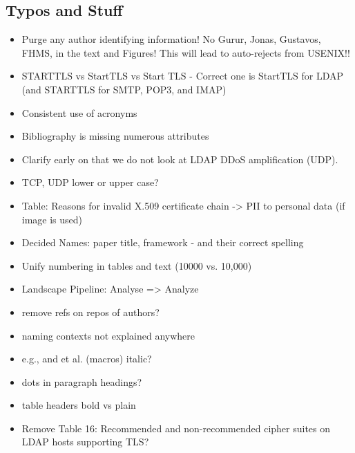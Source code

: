 \subsection*{Typos and Stuff}
\begin{itemize}
    \item {} Purge any author identifying information! No Gurur, Jonas, Gustavos, FHMS, in the text and Figures! This will lead to auto-rejects from USENIX!!
    \item STARTTLS vs StartTLS vs Start TLS - Correct one is StartTLS for LDAP (and STARTTLS for SMTP, POP3, and IMAP)~
    \item Consistent use of acronyms
    \item Bibliography is missing numerous attributes
    \item Clarify early on that we do not look at LDAP DDoS amplification (UDP).
    \item TCP, UDP lower or upper case? 
    \item Table: Reasons for invalid X.509 certificate chain -> PII to personal data (if image is used)
    \item Decided Names: paper title, framework - and their correct spelling
    \item Unify numbering in tables and text (10000 vs. 10,000)
    \item Landscape Pipeline: Analyse => Analyze
    \item remove refs on repos of authors? 
    \item naming contexts not explained anywhere
    \item e.g., and et al. (macros) italic?
    \item dots in paragraph headings?
    \item table headers bold vs plain
    \item Remove Table 16: Recommended and non-recommended cipher suites on LDAP hosts supporting TLS?
\end{itemize}


